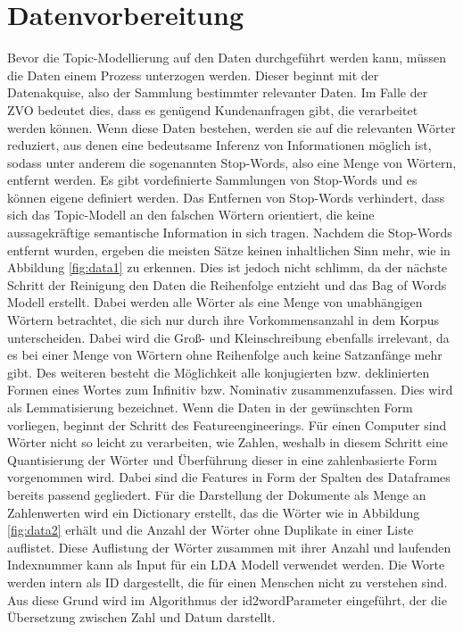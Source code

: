 \documentclass[german,version-2020-11]{uzl-thesis}
\begin{document}
\section{Datenvorbereitung}
Bevor die Topic-Modellierung auf den Daten durchgeführt werden kann, müssen die Daten einem Prozess unterzogen werden. Dieser beginnt mit der Datenakquise, also der Sammlung bestimmter relevanter Daten. Im Falle der ZVO bedeutet dies, dass es genügend Kundenanfragen gibt, die verarbeitet werden können. Wenn diese Daten bestehen, werden sie auf die relevanten Wörter reduziert, aus denen eine bedeutsame Inferenz von Informationen möglich ist, sodass unter anderem die sogenannten Stop-Words, also eine Menge von Wörtern, entfernt werden. Es gibt vordefinierte Sammlungen von Stop-Words und es können eigene definiert werden. Das Entfernen von Stop-Words verhindert, dass sich das Topic-Modell an den falschen Wörtern orientiert, die keine aussagekräftige semantische Information in sich tragen. Nachdem die Stop-Words entfernt wurden, ergeben die meisten Sätze keinen inhaltlichen Sinn mehr, wie in Abbildung \ref{fig:data1} zu erkennen. Dies ist jedoch nicht schlimm, da der nächste Schritt der Reinigung den Daten die Reihenfolge entzieht und das Bag of Words Modell erstellt. Dabei werden alle Wörter als eine Menge von unabhängigen Wörtern betrachtet, die sich nur durch ihre Vorkommensanzahl in dem Korpus unterscheiden. Dabei wird die Groß- und Kleinschreibung ebenfalls irrelevant, da es bei einer Menge von Wörtern ohne Reihenfolge auch keine Satzanfänge mehr gibt. Des weiteren besteht die Möglichkeit alle konjugierten bzw. deklinierten Formen eines Wortes zum Infinitiv bzw. Nominativ zusammenzufassen. Dies wird als Lemmatisierung bezeichnet. Wenn die Daten in der gewünschten Form vorliegen, beginnt der Schritt des Featureengineerings. Für einen Computer sind Wörter nicht so leicht zu verarbeiten, wie Zahlen, weshalb in diesem Schritt eine Quantisierung der Wörter und Überführung dieser in eine zahlenbasierte Form vorgenommen wird. Dabei sind die Features in Form der Spalten des Dataframes bereits passend gegliedert. Für die Darstellung der Dokumente als Menge an Zahlenwerten wird ein Dictionary erstellt, das die Wörter wie in Abbildung \ref{fig:data2} erhält und die Anzahl der Wörter ohne Duplikate in einer Liste auflistet. Diese Auflistung der Wörter zusammen mit ihrer Anzahl und laufenden Indexnummer kann als Input für ein LDA Modell verwendet werden. Die Worte werden intern als ID dargestellt, die für einen Menschen nicht zu verstehen sind. Aus diese Grund wird im Algorithmus der id2wordParameter eingeführt, der die Übersetzung zwischen Zahl und Datum darstellt. 
\end{document}
